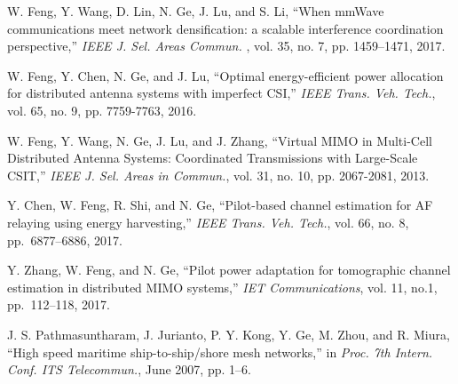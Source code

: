 \documentclass[journal]{IEEEtran}
\begin{document}
\begin{thebibliography}{10}
  W. Feng, Y. Wang, D. Lin, N. Ge, J. Lu, and S. Li, ``When mmWave communications meet network densification: a scalable interference coordination perspective,''
  \emph{IEEE J. Sel. Areas Commun. }, vol. 35, no. 7, pp. 1459--1471, 2017.
 
  W. Feng, Y. Chen, N. Ge, and J. Lu, ``Optimal energy-efficient power allocation for distributed antenna systems with imperfect CSI,''
  \emph{IEEE Trans. Veh. Tech.}, vol. 65, no. 9, pp. 7759-7763, 2016.
 
  W. Feng, Y. Wang, N. Ge, J. Lu, and J. Zhang, ``Virtual MIMO in Multi-Cell Distributed Antenna Systems: Coordinated Transmissions with Large-Scale CSIT,'' 
  \emph{IEEE J. Sel. Areas in Commun.}, vol. 31, no. 10, pp. 2067-2081, 2013.
 
  Y. Chen, W. Feng, R. Shi, and N. Ge, ``Pilot-based channel estimation for AF relaying using energy harvesting,'' \emph{IEEE Trans. Veh. Tech.}, vol. 66, no. 8, pp.~6877--6886, 2017. 

  Y. Zhang, W. Feng, and N. Ge, ``Pilot power adaptation for tomographic channel estimation in distributed MIMO systems,'' \emph{IET Communications}, vol. 11, no.1, pp.~112--118, 2017. 
 
  J. S. Pathmasuntharam, J. Jurianto, P. Y. Kong, Y. Ge, M. Zhou, and R. Miura, ``High speed maritime ship-to-ship/shore mesh networks,'' in
  \emph{Proc. 7th Intern. Conf. ITS Telecommun.}, June 2007, pp. 1--6.
 
 
 
 
  
 
 

\end{thebibliography}
\end{document}
